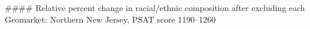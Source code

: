 #### Relative percent change in racial/ethnic composition after excluding each Geomarket: Northern New Jersey, PSAT score 1190–1260

